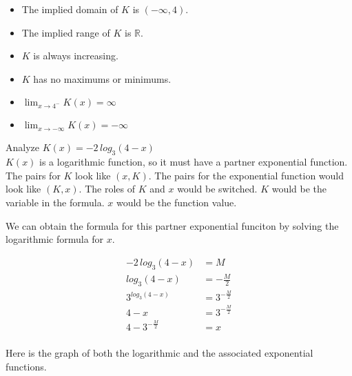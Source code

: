 \documentclass{ximera}
\begin{document}
\begin{example}
\begin{itemize}
\item The implied domain of $K$ is $(-\infty, 4)$.
\item The implied range of $K$ is $\mathbb{R}$.
\item $K$ is always increasing.
\item $K$ has no maximums or minimums.
\item $\lim_{x \to 4^-} K(x) = \infty$
\item $\lim_{x \to -\infty} K(x) = -\infty$
\end{itemize}





\end{example}









Analyze   $K(x) = -2 \,log_3(4-x)$ \\



$K(x)$ is a logarithmic function, so it must have a partner exponential function.  The pairs for $K$ look like $(x, K)$. The pairs for the exponential function would look like $(K, x)$.  The roles of $K$ and $x$ would be switched. $K$ would be the variable in the formula. $x$ would be the function value.


We can obtain the formula for this partner exponential funciton by solving the logarithmic formula for $x$.





\begin{align*}
-2 \,log_3(4-x) & = M \\
log_3(4-x) & = -\frac{M}{2} \\
3^{log_3(4-x)} & = 3^{-\frac{M}{2}} \\
4 - x & = 3^{-\frac{M}{2}} \\
4 - 3^{-\frac{M}{2}} & = x \\
\end{align*}



Here is the graph of both the logarithmic and the associated exponential functions.
\end{document}
